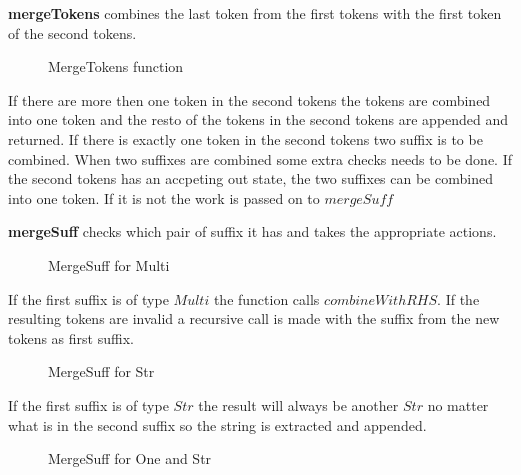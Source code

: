 \textbf{mergeTokens} combines the last token from the first tokens with
the first token of the second tokens.

\begin{figure}[h!]
  
  \caption{MergeTokens function \label{fig:mergetokens}}
\end{figure}
If there are more then one token in the second tokens the tokens are combined
into one token and the resto of the tokens in the second tokens are appended and
returned. If there is exactly one token in the second tokens two suffix is to be
combined. When two suffixes are combined some extra checks needs to be done.
If the second tokens has an accpeting out state, the two suffixes can be
combined into one token. If it is not the work is passed on to $mergeSuff$

\textbf{mergeSuff} checks which pair of suffix it has and takes the appropriate
actions.

\begin{figure}[h!]
  
  \caption{MergeSuff for Multi \label{fig:msmulti}}
\end{figure}

If the first suffix is of type $Multi$ the function calls $combineWithRHS$. If
the resulting tokens are invalid a recursive call is made with the suffix from
the new tokens as first suffix.

\begin{figure}[h!]
  
  \caption{MergeSuff for Str \label{fig:msstr}}
\end{figure}

If the first suffix is of type $Str$ the result will always be another $Str$ no
matter what is in the second suffix so the string is extracted and appended.

\begin{figure}[h!]
  
  \caption{MergeSuff for One and Str \label{fig:msonestr}}
\end{figure}


